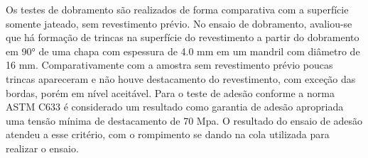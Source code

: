 Os testes de dobramento são realizados de forma comparativa com a
superfície somente jateado, sem revestimento prévio. No ensaio de dobramento,
avaliou-se que há formação de trincas na superfície do revestimento a partir
do dobramento em 90° de uma chapa com espessura de 4.0 mm em um mandril com
diâmetro de 16 mm. Comparativamente com a amostra sem revestimento prévio
poucas trincas apareceram e não houve destacamento do revestimento, com exceção
das bordas, porém em nível aceitável. Para o teste de adesão conforme a norma
ASTM C633 é considerado um resultado como garantia de adesão apropriada uma
tensão mínima de destacamento de 70 Mpa. O resultado do ensaio de adesão
atendeu a esse critério, com o rompimento se dando na cola utilizada para
realizar o ensaio.